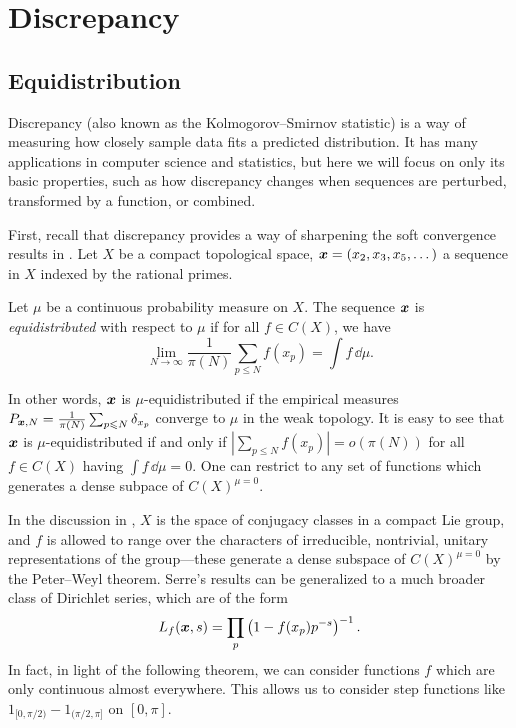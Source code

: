 
\chapter{Discrepancy}\label{ch2:discrepancy}





\section{Equidistribution}

Discrepancy (also known as the Kolmogorov--Smirnov statistic) is a way of 
measuring how closely sample data fits a predicted distribution. It has many 
applications in computer science and statistics, but here we will focus on only 
its basic properties, such as how discrepancy changes when sequences 
are perturbed, transformed by a function, or combined. 

First, recall that discrepancy provides a way of sharpening the soft 
convergence results in \cite[A.1]{serre-1989}. Let $X$ be a compact 
topological space, ${\boldsymbol x} = (x_2,x_3,x_5,\dots)$ a sequence in $X$ indexed by 
the rational primes. 

\begin{definition}
Let $\mu$ be a continuous probability measure on $X$. The sequence ${\boldsymbol x}$ is 
\emph{equidistributed} with respect to $\mu$ if for all $f\in C(X)$, we have 
\[
	\lim_{N\to \infty} \frac{1}{\pi(N)} \sum_{p\leqslant N} f(x_p) = \int f\, \dd \mu .
\]
\end{definition}

In other words, ${\boldsymbol x}$ is $\mu$-equidistributed if the empirical measures 
$P_{{\boldsymbol x},N} = \frac{1}{\pi(N)} \sum_{p\leqslant N} \delta_{x_p}$ converge to 
$\mu$ in the weak topology. It is easy to see that ${\boldsymbol x}$ is 
$\mu$-equidistributed if and only if 
$\left| \sum_{p\leqslant N} f(x_p)\right| = o(\pi(N))$ for all $f\in C(X)$ 
having $\int f\, \dd\mu = 0$. One can restrict to any set of functions which 
generates a dense subpace of $C(X)^{\mu = 0}$. 

In the discussion in \cite[A.1]{serre-1989}, $X$ is the space of conjugacy 
classes in a compact Lie group, and $f$ is allowed to range over the characters 
of irreducible, nontrivial, unitary representations of the group---these 
generate a dense subspace of $C(X)^{\mu = 0}$ by the Peter--Weyl theorem. 
Serre's results can be generalized to a much broader class of Dirichlet series, 
which are of the form 
\[
	L_f({\boldsymbol x},s) = \prod_p \left(1-f(x_p)p^{-s}\right)^{-1} .
\]
In fact, in light of the following theorem, we can consider functions $f$ 
which are only continuous almost everywhere. This allows us to consider 
step functions like $1_{[0,\pi/2)} - 1_{(\pi/2,\pi]}$ on $[0,\pi]$. 

